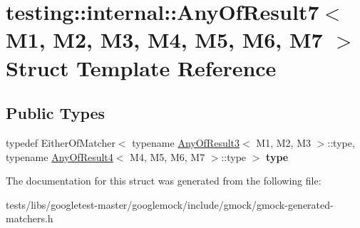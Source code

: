 \hypertarget{structtesting_1_1internal_1_1AnyOfResult7}{}\section{testing\+:\+:internal\+:\+:Any\+Of\+Result7$<$ M1, M2, M3, M4, M5, M6, M7 $>$ Struct Template Reference}
\label{structtesting_1_1internal_1_1AnyOfResult7}
\subsection*{Public Types}
\begin{DoxyCompactItemize}
\item 
\mbox{\label{structtesting_1_1internal_1_1AnyOfResult7_a976873478921520833464a86f840abe8}} 
typedef Either\+Of\+Matcher$<$ typename \hyperlink{structtesting_1_1internal_1_1AnyOfResult3}{Any\+Of\+Result3}$<$ M1, M2, M3 $>$\+::type, typename \hyperlink{structtesting_1_1internal_1_1AnyOfResult4}{Any\+Of\+Result4}$<$ M4, M5, M6, M7 $>$\+::type $>$ {\bfseries type}
\end{DoxyCompactItemize}


The documentation for this struct was generated from the following file\+:\begin{DoxyCompactItemize}
\item 
tests/libs/googletest-\/master/googlemock/include/gmock/gmock-\/generated-\/matchers.\+h\end{DoxyCompactItemize}
